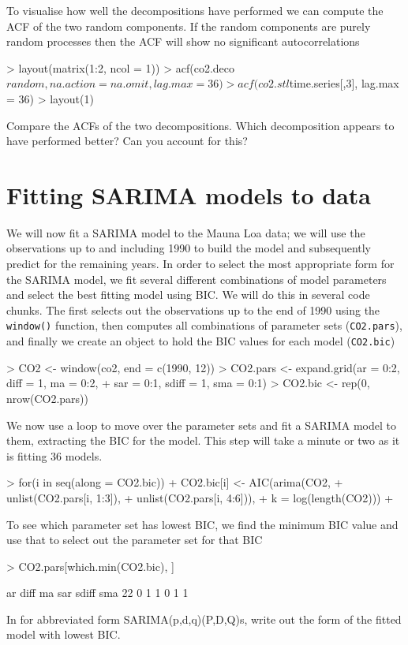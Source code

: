 \documentclass[a4paper,10pt]{article}
\begin{document}
To visualise how well the decompositions have performed we can compute the ACF of the two random components. If the random components are purely random processes then the ACF will show no significant autocorrelations
\begin{Schunk}
\begin{Sinput}
> layout(matrix(1:2, ncol = 1))
> acf(co2.deco$random, na.action = na.omit, lag.max = 36)
> acf(co2.stl$time.series[,3], lag.max = 36)
> layout(1)
\end{Sinput}
\end{Schunk}
Compare the ACFs of the two decompositions. Which decomposition appears to have performed better? Can you account for this?

\section{Fitting SARIMA models to data}
We will now fit a SARIMA model to the Mauna Loa data; we will use the observations up to and including 1990 to build the model and subsequently predict for the remaining years. In order to select the most appropriate form for the SARIMA model, we fit several different combinations of model parameters and select the best fitting model using BIC. We will do this in several code chunks. The first selects out the observations up to the end of 1990 using the \texttt{window()} function, then computes all combinations of parameter sets (\texttt{CO2.pars}), and finally we create an object to hold the BIC values for each model (\texttt{CO2.bic})
\begin{Schunk}
\begin{Sinput}
> CO2 <- window(co2, end = c(1990, 12))
> CO2.pars <- expand.grid(ar = 0:2, diff = 1, ma = 0:2,
+                         sar = 0:1, sdiff = 1, sma = 0:1)
> CO2.bic <- rep(0, nrow(CO2.pars))
\end{Sinput}
\end{Schunk}
We now use a loop to move over the parameter sets and fit a SARIMA model to them, extracting the BIC for the model. This step will take a minute or two as it is fitting 36 models.
\begin{Schunk}
\begin{Sinput}
> for(i in seq(along = CO2.bic)) {
+     CO2.bic[i] <- AIC(arima(CO2,
+                             unlist(CO2.pars[i, 1:3]),
+                             unlist(CO2.pars[i, 4:6])),
+                       k = log(length(CO2)))
+ }
\end{Sinput}
\end{Schunk}
To see which parameter set has lowest BIC, we find the minimum BIC value and use that to select out the parameter set for that BIC
\begin{Schunk}
\begin{Sinput}
> CO2.pars[which.min(CO2.bic), ]
\end{Sinput}
\begin{Soutput}
   ar diff ma sar sdiff sma
22  0    1  1   0     1   1
\end{Soutput}
\end{Schunk}
In for abbreviated form SARIMA(p,d,q)(P,D,Q)s, write out the form of the fitted model with lowest BIC.
\end{document}
